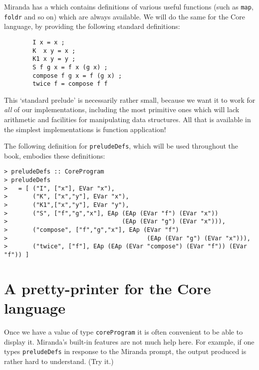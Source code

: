 Miranda has a  which contains definitions of
various useful functions (such as \mbox{\tt map}, \mbox{\tt foldr} and so on)
which are always available.  We will do the same for the Core language,
by providing the following standard definitions:
\begin{verbatim}
        I x = x ;
        K  x y = x ;
        K1 x y = y ;
        S f g x = f x (g x) ;
        compose f g x = f (g x) ;
        twice f = compose f f
\end{verbatim}
This `standard prelude' is necessarily rather small, because we want it
to work for {\em all\/} of our implementations, including the most primitive
ones which will lack arithmetic and facilities for manipulating data
structures.  All that is available in the simplest implementations
is function application!

The following definition for \mbox{\tt preludeDefs}, which will be used
throughout the book, embodies these definitions:
\begin{verbatim}
> preludeDefs :: CoreProgram
> preludeDefs
>   = [ ("I", ["x"], EVar "x"),
>       ("K", ["x","y"], EVar "x"),
>       ("K1",["x","y"], EVar "y"),
>       ("S", ["f","g","x"], EAp (EAp (EVar "f") (EVar "x"))
>                                (EAp (EVar "g") (EVar "x"))),
>       ("compose", ["f","g","x"], EAp (EVar "f")
>                                       (EAp (EVar "g") (EVar "x"))),
>       ("twice", ["f"], EAp (EAp (EVar "compose") (EVar "f")) (EVar "f")) ]
\end{verbatim}
%

\section{A pretty-printer for the Core language}
\label{sect:pretty}  

Once we have a value of type \mbox{\tt coreProgram} it is often convenient to
be able to display it.  Miranda's built-in features are not much help
here.  For example, if one types \mbox{\tt preludeDefs} in response to the
Miranda prompt, the output produced is rather hard to understand.  (Try it.)

